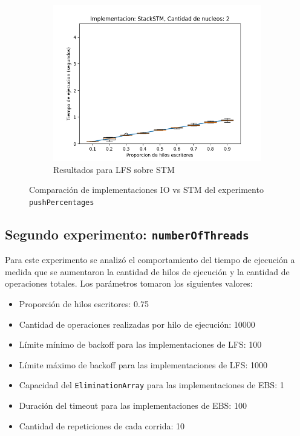 \begin{figure}[t]
\begin{subfigure}[b]{0.49\textwidth}
        \includegraphics[width=\textwidth]{images/pushPercentages/plots/expStackSTM-2}
        \caption{Resultados para LFS sobre STM}
        \label{subfig:pushPercentages-stackstm-2}
    \end{subfigure}
    \caption{Comparación de implementaciones IO vs STM del experimento \texttt{pushPercentages}}
    \label{fig:pushPercentages-boxplots}
\end{figure}


\subsection{Segundo experimento: \texttt{numberOfThreads}}\label{subsec:numberOfThreads}
Para este experimento se analizó el comportamiento del tiempo de ejecución a medida que se aumentaron la cantidad de hilos de ejecución y la cantidad de operaciones totales.
Los parámetros tomaron los siguientes valores:

\begin{itemize}
    \item Proporción de hilos escritores: 0.75
    \item Cantidad de operaciones realizadas por hilo de ejecución: 10000
    \item Límite mínimo de backoff para las implementaciones de LFS: 100
    \item Límite máximo de backoff para las implementaciones de LFS: 1000
    \item Capacidad del \texttt{EliminationArray} para las implementaciones de EBS: 1
    \item Duración del timeout para las implementaciones de EBS: 100
    \item Cantidad de repeticiones de cada corrida: 10
\end{itemize}

